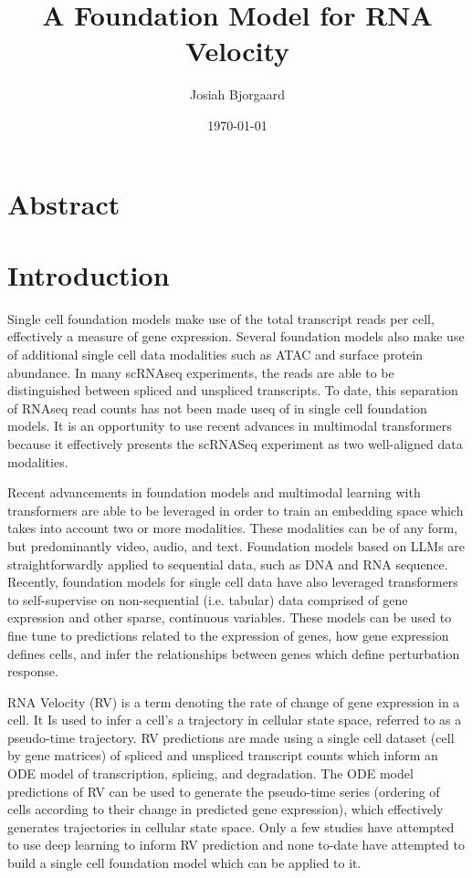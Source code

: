 \documentclass{article} %
\title{A Foundation Model for RNA Velocity} %
\author[1]{Josiah Bjorgaard} %
\affil[1]{Syntensor, Inc.}
\date{\today} %
\begin{document}
    \maketitle %
    
  \section{Abstract} %
    
  \section{Introduction}
Single cell foundation models make use of the total transcript reads per cell, effectively a measure of gene expression. Several foundation models also make use of additional single cell data modalities such as ATAC and surface protein abundance. In many scRNAseq experiments, the reads are able to be distinguished between spliced and unspliced transcripts. To date, this separation of RNAseq read counts has not been made useq of in single cell foundation models. It is an opportunity to use recent advances in multimodal transformers because it effectively presents the scRNASeq experiment as two well-aligned data modalities.

Recent advancements in foundation models and multimodal learning with transformers are able to be leveraged in order to train an embedding space which takes into account two or more modalities. These modalities can be of any form, but predominantly video, audio, and text. Foundation models based on LLMs are straightforwardly applied to sequential data, such as DNA and RNA sequence. Recently, foundation models for single cell data have also leveraged transformers to self-supervise on non-sequential (i.e. tabular) data comprised of gene expression and other sparse, continuous variables. These models can be used to fine tune to predictions related to the expression of genes, how gene expression defines cells, and infer the relationships between genes which define perturbation response.

RNA Velocity (RV) is a term denoting the rate of change of gene expression in a cell. It Is used to infer a cell's a trajectory in cellular state space, referred to as a pseudo-time trajectory. RV predictions are made using a single cell dataset (cell by gene matrices) of spliced and unspliced transcript counts which inform an ODE model of transcription, splicing, and degradation. The ODE model predictions of RV can be used to generate the pseudo-time series (ordering of cells according to their change in predicted gene expression), which effectively generates trajectories in cellular state space. Only a few studies have attempted to use deep learning to inform RV prediction and none to-date have attempted to build a single cell foundation model which can be applied to it.
\end{document}
